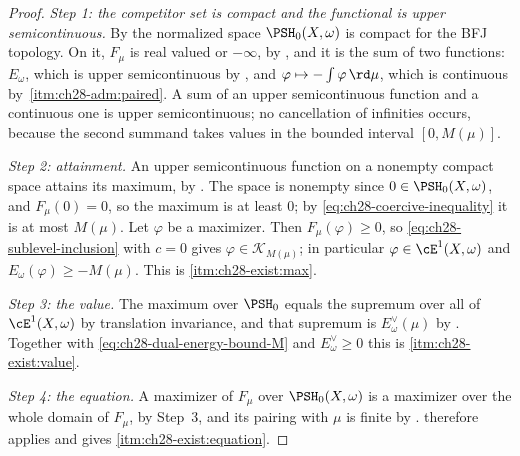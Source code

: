 \begin{proof}
\emph{Step 1: the competitor set is compact and the functional is upper
semicontinuous.}  By  the normalized space
\(\PSH_0(X,\omega)\) is compact for the BFJ topology.  On it, \(F_\mu\) is
real valued or \(-\infty\), by , and it is the sum
of two functions: \(E_\omega\), which is upper semicontinuous by
, and
\(\varphi\mapsto-\int\varphi\,\rd\mu\), which is continuous by
\,\cref{itm:ch28-adm:paired}.  A sum of an
upper semicontinuous function and a continuous one is upper semicontinuous;
no cancellation of infinities occurs, because the second summand takes
values in the bounded interval \([0,M(\mu)]\).

\emph{Step 2: attainment.}  An upper semicontinuous function on a nonempty
compact space attains its maximum, by .  The space
is nonempty since \(0\in\PSH_0(X,\omega)\), and \(F_\mu(0)=0\), so the
maximum is at least \(0\); by \eqref{eq:ch28-coercive-inequality} it is at
most \(M(\mu)\).  Let \(\varphi\) be a maximizer.  Then
\(F_\mu(\varphi)\geq0\), so \eqref{eq:ch28-sublevel-inclusion} with \(c=0\)
gives \(\varphi\in\mathcal K_{M(\mu)}\); in particular
\(\varphi\in\cE^1(X,\omega)\) and \(E_\omega(\varphi)\geq-M(\mu)\).  This is
\cref{itm:ch28-exist:max}.

\emph{Step 3: the value.}  The maximum over \(\PSH_0\) equals the supremum
over all of \(\cE^1(X,\omega)\) by translation invariance, and that supremum
is \(E^\vee_\omega(\mu)\) by .  Together
with \eqref{eq:ch28-dual-energy-bound-M} and \(E^\vee_\omega\geq0\) this is
\cref{itm:ch28-exist:value}.

\emph{Step 4: the equation.}  A maximizer of \(F_\mu\) over
\(\PSH_0(X,\omega)\) is a maximizer over the whole domain of \(F_\mu\), by
Step~3, and its pairing with \(\mu\) is finite by
.  
therefore applies and gives \cref{itm:ch28-exist:equation}.
\end{proof}

